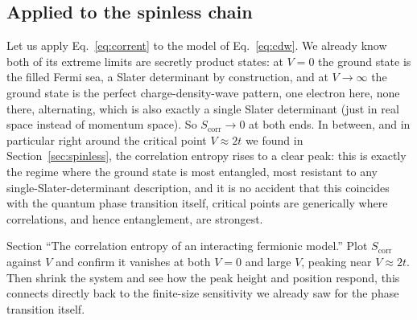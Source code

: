 \documentclass[all_sessions.tex]{subfiles}
\begin{document}
\subsection{Applied to the spinless chain}
Let us apply Eq.~\eqref{eq:corrent} to the model of Eq.~\eqref{eq:cdw}. We already know both of its
extreme limits are secretly product states: at $V=0$ the ground state is the filled Fermi sea, a
Slater determinant by construction, and at $V\to\infty$ the ground state is the perfect
charge-density-wave pattern, one electron here, none there, alternating, which is also exactly a
single Slater determinant (just in real space instead of momentum space). So $S_{\mathrm{corr}}
\to 0$ at both ends. In between, and in particular right around the critical point $V\approx 2t$ we
found in Section~\ref{sec:spinless}, the correlation entropy rises to a clear peak: this is exactly
the regime where the ground state is most entangled, most resistant to any single-Slater-determinant
description, and it is no accident that this coincides with the quantum phase transition itself,
critical points are generically where correlations, and hence entanglement, are strongest.

\begin{notebook}
Section ``The correlation entropy of an interacting fermionic model.'' Plot $S_{\mathrm{corr}}$
against $V$ and confirm it vanishes at both $V=0$ and large $V$, peaking near $V\approx2t$. Then
shrink the system and see how the peak height and position respond, this connects directly back to
the finite-size sensitivity we already saw for the phase transition itself.
\end{notebook}
\end{document}
